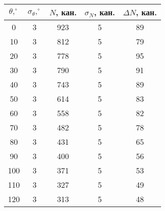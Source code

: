 \begin{tabular}{ccccc}
\toprule
$\theta, ^\circ$ & $\sigma_{\theta}, ^\circ$ & $N$, кан. & $\sigma_N$, кан. & $\Delta N$, кан. \\
\midrule
0 & 3 & 923 & 5 & 89 \\
10 & 3 & 812 & 5 & 79 \\
20 & 3 & 778 & 5 & 95 \\
30 & 3 & 790 & 5 & 91 \\
40 & 3 & 743 & 5 & 89 \\
50 & 3 & 614 & 5 & 83 \\
60 & 3 & 558 & 5 & 82 \\
70 & 3 & 482 & 5 & 78 \\
80 & 3 & 431 & 5 & 65 \\
90 & 3 & 400 & 5 & 56 \\
100 & 3 & 371 & 5 & 53 \\
110 & 3 & 327 & 5 & 49 \\
120 & 3 & 313 & 5 & 48 \\
\bottomrule
\end{tabular}
